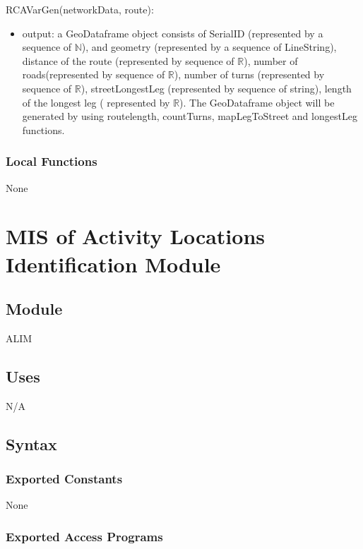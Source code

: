 \documentclass[12pt, titlepage]{article}
\begin{document}
\noindent RCAVarGen(networkData, route):
\begin{itemize}
\item output: a GeoDataframe object consists of SerialID (represented by a sequence of $\mathbb{N}$), and geometry (represented by a sequence of LineString), distance of the route (represented by sequence of $\mathbb{R}$), number of roads(represented by sequence of $\mathbb{R}$), number of turns (represented by sequence of $\mathbb{R}$), streetLongestLeg (represented by sequence of string), length of the longest leg ( represented by  $\mathbb{R}$). The GeoDataframe object will be generated by using 
routelength, countTurns, mapLegToStreet and longestLeg functions.
\end{itemize}

\subsubsection{Local Functions}
None

\newpage

\section{MIS of Activity Locations Identification Module} \label{ALIM} %

\subsection{Module}

{ALIM}

\subsection{Uses}

N/A

\subsection{Syntax}

\subsubsection{Exported Constants}
None

\subsubsection{Exported Access Programs}
\end{document}
